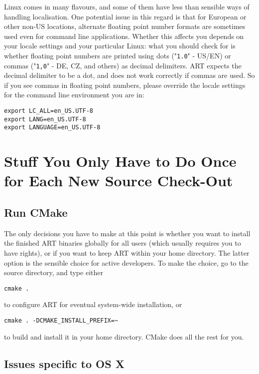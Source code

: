Linux comes in many flavours, and some of them have less than sensible ways of handling localisation. One potential issue in this regard is that for European or other non-US locations, alternate floating point number formats are sometimes used even for command line applications. Whether this affects you depends on your locale settings and your particular Linux: what you should check for is whether floating point numbers are printed using dots ("{\tt 1.0}" - US/EN) or commas ("{\tt 1,0}" - DE, CZ, and others) as decimal delimiters. ART expects the decimal delimiter to be a dot, and does not work correctly if commas are used. So if you see commas in floating point numbers, please override the locale settings for the command line environment you are in:

\begin{verbatim}
export LC_ALL=en_US.UTF-8
export LANG=en_US.UTF-8
export LANGUAGE=en_US.UTF-8
\end{verbatim}

\section{Stuff You Only Have to Do Once for Each New Source Check-Out}

\subsection{Run CMake}

The only decisions you have to make at this point is whether you want to install the finished ART binaries globally for all users (which usually requires you to have  rights), or if you want to keep ART within your home directory. The latter option is the sensible choice for active developers. To make the choice, go to the source directory, and type either

\begin{verbatim}
cmake .
\end{verbatim}

to configure ART for eventual system-wide installation, or

\begin{verbatim}
cmake . -DCMAKE_INSTALL_PREFIX=~
\end{verbatim}

to build and install it in your home directory. CMake does all the rest for you.

\subsection{Issues specific to OS X}

